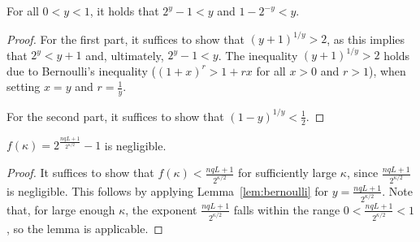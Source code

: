 \begin{lemma}\label{lem:bernoulli}
  For all $0 < y < 1$, it holds that $2^y - 1 < y$
  and $1 - 2^{-y} < y$.
\end{lemma}
\begin{proof}
  For the first part,
  it suffices to show that $(y + 1)^{1/y} > 2$,
  as this implies that $2^y < y + 1$ and, ultimately, $2^y - 1 < y$.
  The inequality $(y + 1)^{1/y} > 2$ holds due to Bernoulli's
  inequality ($(1 + x)^r > 1 + rx$ for all $x > 0$ and $r > 1$),
  when setting $x = y$ and $r = \frac{1}{y}$.

  For the second part,
  it suffices to show that $(1 - y)^{1/y} < \frac{1}{2}$.
  \Qed
\end{proof}

\begin{lemma}
  $f(\kappa) = 2^{\frac{nqL + 1}{2^{\kappa/2}}} - 1$ is negligible.
\end{lemma}
\begin{proof}
  It suffices to show that $f(\kappa) < \frac{nqL + 1}{2^{\kappa/2}}$
  for sufficiently large $\kappa$, since $\frac{nqL + 1}{2^{\kappa/2}}$
  is negligible.
  This follows by applying Lemma~\ref{lem:bernoulli} for $y = \frac{nqL + 1}{2^{\kappa/2}}$.
  Note that, for large enough $\kappa$, the exponent $\frac{nqL + 1}{2^{\kappa/2}}$
  falls within the range $0 < \frac{nqL + 1}{2^{\kappa/2}} < 1$,
  so the lemma is applicable.
  \Qed
\end{proof}